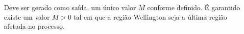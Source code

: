 Deve ser gerado como saída, um único valor $M$ conforme definido. É garantido existe um valor $M > 0$ tal em que a região Wellington seja a última região afetada no processo.
